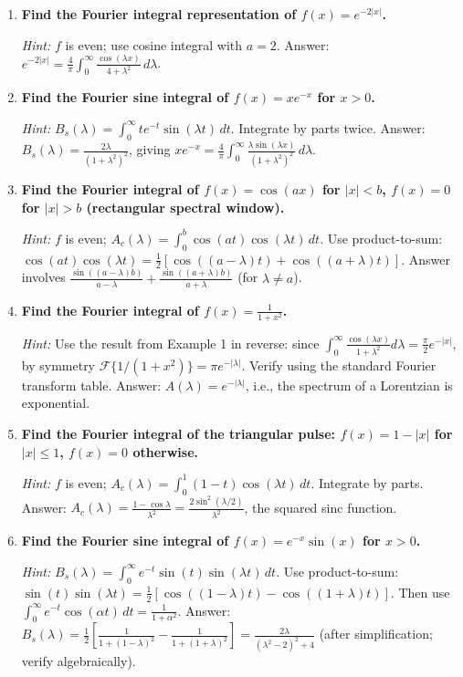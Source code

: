 \documentclass[12pt,a4paper]{article}
\begin{document}
\begin{enumerate}[label=\textbf{P\arabic*.}]

\item \textbf{Find the Fourier integral representation of $f(x)=e^{-2|x|}$.}

\textit{Hint:} $f$ is even; use cosine integral with $a=2$. Answer: $e^{-2|x|}=\frac{4}{\pi}\int_0^\infty\frac{\cos(\lambda x)}{4+\lambda^2}\,d\lambda$.

\item \textbf{Find the Fourier sine integral of $f(x)=xe^{-x}$ for $x>0$.}

\textit{Hint:} $B_s(\lambda)=\int_0^\infty te^{-t}\sin(\lambda t)\,dt$. Integrate by parts twice. Answer: $B_s(\lambda)=\frac{2\lambda}{(1+\lambda^2)^2}$, giving $xe^{-x}=\frac{4}{\pi}\int_0^\infty\frac{\lambda\sin(\lambda x)}{(1+\lambda^2)^2}\,d\lambda$.

\item \textbf{Find the Fourier integral of $f(x)=\cos(ax)$ for $|x|<b$, $f(x)=0$ for $|x|>b$ (rectangular spectral window).}

\textit{Hint:} $f$ is even; $A_c(\lambda)=\int_0^b\cos(at)\cos(\lambda t)\,dt$. Use product-to-sum: $\cos(at)\cos(\lambda t)=\frac{1}{2}[\cos((a-\lambda)t)+\cos((a+\lambda)t)]$. Answer involves $\frac{\sin((a-\lambda)b)}{a-\lambda}+\frac{\sin((a+\lambda)b)}{a+\lambda}$ (for $\lambda\neq a$).

\item \textbf{Find the Fourier integral of $f(x)=\frac{1}{1+x^2}$.}

\textit{Hint:} Use the result from Example 1 in reverse: since $\int_0^\infty\frac{\cos(\lambda x)}{1+\lambda^2}d\lambda=\frac{\pi}{2}e^{-|x|}$, by symmetry $\mathcal{F}\{1/(1+x^2)\}=\pi e^{-|\lambda|}$. Verify using the standard Fourier transform table. Answer: $A(\lambda)=e^{-|\lambda|}$, i.e., the spectrum of a Lorentzian is exponential.

\item \textbf{Find the Fourier integral of the triangular pulse: $f(x)=1-|x|$ for $|x|\leq1$, $f(x)=0$ otherwise.}

\textit{Hint:} $f$ is even; $A_c(\lambda)=\int_0^1(1-t)\cos(\lambda t)\,dt$. Integrate by parts. Answer: $A_c(\lambda)=\frac{1-\cos\lambda}{\lambda^2}=\frac{2\sin^2(\lambda/2)}{\lambda^2}$, the squared sinc function.

\item \textbf{Find the Fourier sine integral of $f(x)=e^{-x}\sin(x)$ for $x>0$.}

\textit{Hint:} $B_s(\lambda)=\int_0^\infty e^{-t}\sin(t)\sin(\lambda t)\,dt$. Use product-to-sum: $\sin(t)\sin(\lambda t)=\frac{1}{2}[\cos((1-\lambda)t)-\cos((1+\lambda)t)]$. Then use $\int_0^\infty e^{-t}\cos(\alpha t)\,dt=\frac{1}{1+\alpha^2}$. Answer: $B_s(\lambda)=\frac{1}{2}\!\left[\frac{1}{1+(1-\lambda)^2}-\frac{1}{1+(1+\lambda)^2}\right]=\frac{2\lambda}{(\lambda^2-2)^2+4}$ (after simplification; verify algebraically).

\end{enumerate}
\end{document}
